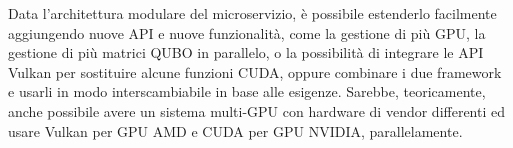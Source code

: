 
Data l'architettura modulare del microservizio, è possibile estenderlo facilmente aggiungendo nuove \gls{API} e nuove funzionalità, come la gestione di più \gls{GPU}, la gestione di più matrici \gls{QUBO} in parallelo, o la possibilità di integrare le \gls{API} Vulkan per sostituire alcune funzioni \gls{CUDA}, oppure combinare i due framework e usarli in modo interscambiabile in base alle esigenze. Sarebbe, teoricamente, anche possibile avere un sistema multi-GPU con hardware di vendor differenti ed usare Vulkan per \gls{GPU} AMD e \gls{CUDA} per \gls{GPU} NVIDIA, parallelamente.


